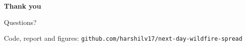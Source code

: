 \documentclass[aspectratio=169,11pt]{beamer}
\begin{document}
\begin{frame}[plain]
\centering
\vfill
{\color{accent}\Huge\bfseries Thank you\par}
\vspace{0.8em}
{\large Questions?\par}
\vspace{1.5em}
{\small\color{muted}Code, report and figures: \texttt{github.com/harshilv17/next-day-wildfire-spread}\par}
\vfill
\end{frame}
\end{document}
